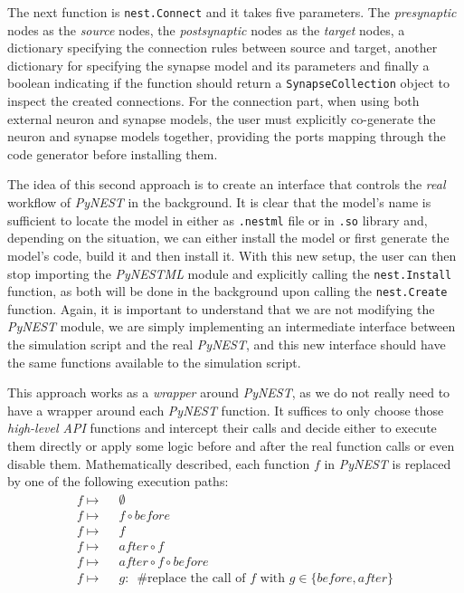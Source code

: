The next function is \texttt{nest.Connect} and it takes five parameters. The \emph{presynaptic} nodes as the \emph{source} nodes, the \emph{postsynaptic} nodes as the \emph{target} nodes, a dictionary specifying the connection rules between source and target, another dictionary for specifying the synapse model and its parameters and finally a boolean indicating if the function should return a \texttt{SynapseCollection} object to inspect the created connections. For the connection part, when using both external neuron and synapse models, the user must explicitly co-generate the neuron and synapse models together, providing the ports mapping through the code generator before installing them.

The idea of this second approach is to create an interface that controls the \emph{real} workflow of \emph{PyNEST} in the background. It is clear that the model's name is sufficient to locate the model in either as \texttt{.nestml} file or in \texttt{.so} library and, depending on the situation, we can either install the model or first generate the model's code, build it and then install it. With this new setup, the user can then stop importing the \emph{PyNESTML} module and explicitly calling the \texttt{nest.Install} function, as both will be done in the background upon calling the \texttt{nest.Create} function. Again, it is important to understand that we are not modifying the \emph{PyNEST} module, we are simply implementing an intermediate interface between the simulation script and the real \emph{PyNEST}, and this new interface should have the same functions available to the simulation script.



This approach works as a \emph{wrapper} around \emph{PyNEST}, as we do not really need to have a wrapper around each \emph{PyNEST} function. It suffices to only choose those \emph{high-level API} functions and intercept their calls and decide either to execute them directly or apply some logic before and after the real function calls or even disable them.  Mathematically described, each function $f$ in \emph{PyNEST} is replaced by one of the following execution paths:
\begin{align*} 
f \mapsto&\enspace\emptyset\\
f \mapsto&\enspace f \circ before \\
f \mapsto&\enspace f \\
f \mapsto&\enspace after \circ f \\
f \mapsto&\enspace after \circ f \circ before\\
f \mapsto&\enspace g:\enspace \text{\#replace the call of } f \text{ with } g \in \{before, after\}  \\
\end{align*}


